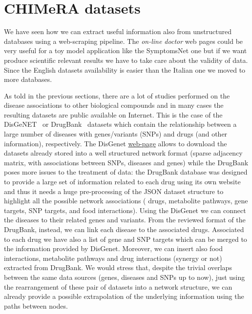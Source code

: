 \documentclass{standalone}
\begin{document}
\section[Dataset]{CHIMeRA datasets}\label{chimera:net}

We have seen how we can extract useful information also from unstructured databases using a web-scraping pipeline.
The \emph{on-line doctor} web pages could be very useful for a toy model application like the \textsf{SymptomsNet} one but if we want produce scientific relevant results we have to take care about the validity of data.
Since the English datasets availability is easier than the Italian one we moved to more  databases.

As told in the previous sections, there are a lot of studies performed on the disease associations to other biological compounds and in many cases the resulting datasets are public available on Internet.
This is the case of the DisGeNET~\cite{DisGeNet} or DrugBank~\cite{DrugBank} datasets which contain the relationship between a large number of diseases with genes/variants (SNPs) and drugs (and other information), respectively.
The DisGenet \href{https://doi.org/10.1093/nar/gkw943}{web-page} allows to download the datasets already stored into a well structured network format (sparse adjacency matrix, with  associations between  SNPs,  diseases and  genes) while the DrugBank poses more issues to the treatment of data: the DrugBank database was designed to provide a large set of information related to each drug using its own website and thus it needs a huge pre-processing of the JSON dataset structure to highlight all the possible network associations ( drugs,  metabolite pathways,  gene targets,  SNP targets, and  food interactions).
Using the DisGenet we can connect the diseases to their related genes and variants.
From the reviewed format of the DrugBank, instead, we can link each disease to the associated drugs.
Associated to each drug we have also a list of gene and SNP targets which can be merged to the information provided by DisGenet.
Moreover, we can insert also food interactions, metabolite pathways and drug interactions (synergy or not) extracted from DrugBank.
We would stress that, despite the trivial overlaps between the same data sources (genes, diseases and SNPs up to now), just using the rearrangement of these pair of datasets into a network structure, we can already provide a possible extrapolation of the underlying information using the paths between nodes.
\end{document}
